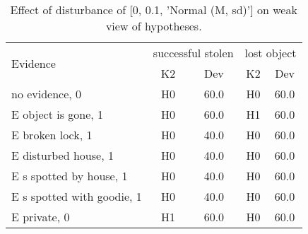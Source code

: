 \begin{table}\begin{tabular}{l|cc|cc}\toprule\multirow{2}{*}{Evidence} & \multicolumn{2}{c}{successful stolen}& \multicolumn{2}{c}{lost object}\\& {K2} & {Dev}& {K2} & {Dev}\\\midrule
no evidence, 0 & \cellcolor{Bittersweet}H0&\cellcolor{Bittersweet}60.0&\cellcolor{Bittersweet}H0&\cellcolor{Bittersweet}60.0\\E object is gone, 1 & \cellcolor{Bittersweet}H0&\cellcolor{Bittersweet}60.0&\cellcolor{Bittersweet}H1&\cellcolor{Bittersweet}60.0\\E broken lock, 1 & \cellcolor{Bittersweet}H0&\cellcolor{Bittersweet}40.0&\cellcolor{Bittersweet}H0&\cellcolor{Bittersweet}60.0\\E disturbed house, 1 & \cellcolor{Bittersweet}H0&\cellcolor{Bittersweet}40.0&\cellcolor{Bittersweet}H0&\cellcolor{Bittersweet}60.0\\E s spotted by house, 1 & \cellcolor{Bittersweet}H0&\cellcolor{Bittersweet}40.0&\cellcolor{Bittersweet}H0&\cellcolor{Bittersweet}60.0\\E s spotted with goodie, 1 & \cellcolor{Bittersweet}H0&\cellcolor{Bittersweet}40.0&\cellcolor{Bittersweet}H0&\cellcolor{Bittersweet}60.0\\E private, 0 & \cellcolor{Bittersweet}H1&\cellcolor{Bittersweet}60.0&\cellcolor{Bittersweet}H0&\cellcolor{Bittersweet}60.0\\\bottomrule\end{tabular}\caption{Effect of disturbance of [0, 0.1, 'Normal (M, sd)'] on weak view of hypotheses.}\end{table}